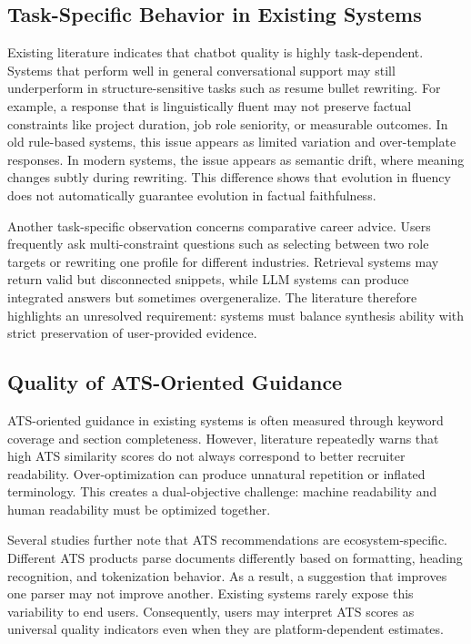 \documentclass[conference]{IEEEtran}
\begin{document}
\subsection{Task-Specific Behavior in Existing Systems}
Existing literature indicates that chatbot quality is highly task-dependent. Systems that perform well in general conversational support may still underperform in structure-sensitive tasks such as resume bullet rewriting. For example, a response that is linguistically fluent may not preserve factual constraints like project duration, job role seniority, or measurable outcomes. In old rule-based systems, this issue appears as limited variation and over-template responses. In modern systems, the issue appears as semantic drift, where meaning changes subtly during rewriting. This difference shows that evolution in fluency does not automatically guarantee evolution in factual faithfulness.

Another task-specific observation concerns comparative career advice. Users frequently ask multi-constraint questions such as selecting between two role targets or rewriting one profile for different industries. Retrieval systems may return valid but disconnected snippets, while LLM systems can produce integrated answers but sometimes overgeneralize. The literature therefore highlights an unresolved requirement: systems must balance synthesis ability with strict preservation of user-provided evidence.

\subsection{Quality of ATS-Oriented Guidance}
ATS-oriented guidance in existing systems is often measured through keyword coverage and section completeness. However, literature repeatedly warns that high ATS similarity scores do not always correspond to better recruiter readability. Over-optimization can produce unnatural repetition or inflated terminology. This creates a dual-objective challenge: machine readability and human readability must be optimized together.

Several studies further note that ATS recommendations are ecosystem-specific. Different ATS products parse documents differently based on formatting, heading recognition, and tokenization behavior. As a result, a suggestion that improves one parser may not improve another. Existing systems rarely expose this variability to end users. Consequently, users may interpret ATS scores as universal quality indicators even when they are platform-dependent estimates.
\end{document}
